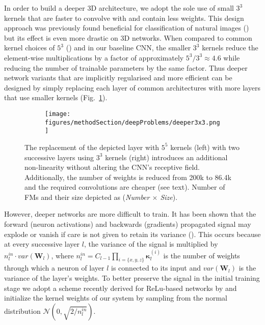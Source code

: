 \documentclass[preprint,authoryear,12pt]{elsarticle}
\begin{document}
In order to build a deeper 3D architecture, we adopt the sole use of small $3^3$ kernels that are faster to convolve with and contain less weights. This design approach was previously found beneficial for classification of natural images (\cite{Simonyan2014}) but its effect is even more drastic on 3D networks. When compared to common kernel choices of $5^3$ (\cite{zikic2014CnnBrats, urban2014CnnBrats, prasoon2013Knee}) and in our baseline CNN, the smaller $3^3$ kernels reduce the element-wise multiplications by a factor of approximately $5^3/3^3 \approx 4.6$ while reducing the number of trainable parameters by the same factor. Thus deeper network variants that are implicitly regularised and more efficient can be designed by simply replacing each layer of common architectures with more layers that use smaller kernels (Fig.~\ref{fig:deeper3x3}). 



\begin{figure}[!h]
\centering
\begin{subfigure}[b]{0.5\textwidth}
\centering
	\texttt{[image: figures/methodSection/deepProblems/deeper3x3.png]}
\end{subfigure}

\caption{The replacement of the depicted layer with $5^5$ kernels (left) with two successive layers using $3^3$ kernels (right) introduces an additional non-linearity without altering the CNN's receptive field. Additionally, the number of weights is reduced from 200k to 86.4k and the required convolutions are cheaper (see text). Number of FMs and their size depicted as (\textit{Number $\times$ Size}).}
\label{fig:deeper3x3}
\end{figure}
%
 


However, deeper networks are more difficult to train. It has been shown that the forward (neuron activations) and backwards (gradients) propagated signal may explode or vanish if care is not given to retain its variance (\cite{Glorot2010}). This occurs because at every successive layer $l$, the variance of the signal is multiplied by $n^{in}_l \cdot var(\mathbf{W}_l)$, where $n^{in}_l=C_{l-1} \prod_{i=\{x,y,z\}}{\boldsymbol{\kappa}_{l}^{(i)}}$ is the number of weights through which a neuron of layer $l$ is connected to its input and $var(\mathbf{W}_l)$ is the variance of the layer's weights. To better preserve the signal in the initial training stage we adopt a scheme recently derived for ReLu-based networks by \cite{he2015delving} and initialize the kernel weights of our system by sampling from the normal distribution $\mathcal{N}(0,\sqrt{2/n^{in}_l})$.
\end{document}
